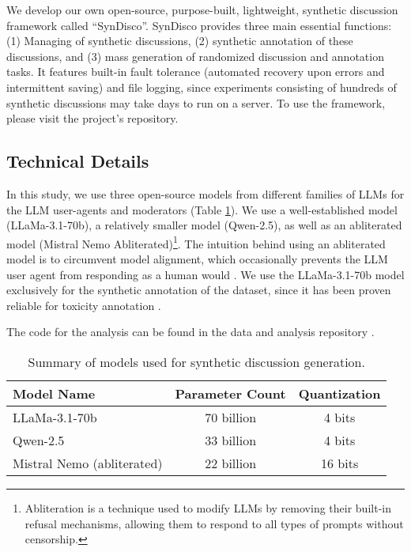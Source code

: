 We develop our own open-source, purpose-built, lightweight, synthetic discussion framework called “SynDisco”. SynDisco provides three main essential functions: (1) Managing of synthetic discussions, (2) synthetic annotation of these discussions, and (3) mass generation of randomized discussion and annotation tasks. It features built-in fault tolerance (automated recovery upon errors and intermittent saving) and file logging, since experiments consisting of hundreds of synthetic discussions may take days to run on a server. To use the framework, please visit the project's repository\projectlink.

\subsection{Technical Details}
\label{ssec:experimental:technical}

In this study, we use three open-source models from different families of \acp{LLM} for the \ac{LLM} user-agents and moderators (Table \ref{tab:models}). We use a well-established model (LLaMa-3.1-70b), a relatively smaller model (Qwen-2.5), as well as an abliterated model (Mistral Nemo Abliterated)\footnote{Abliteration is a technique used to modify \acp{LLM} by removing their built-in refusal mechanisms, allowing them to respond to all types of prompts without censorship.}. The intuition behind using an abliterated model is to circumvent model alignment, which occasionally prevents the \ac{LLM} user agent from responding as a human would \cite{Park2023GenerativeAI}. We use the LLaMa-3.1-70b model exclusively for the synthetic annotation of the dataset, since it has been proven reliable for toxicity annotation \cite{koh-etal-2024-llms}. 

The code for the analysis can be found in the data and analysis repository \analysislink.

\begin{table}[ht]
\centering
    \begin{tabular}{|l|c|c|}
        \hline
        \rowcolor{gray!30} \textbf{Model Name} & \textbf{Parameter Count} & \textbf{Quantization} \\
        \hline
        LLaMa-3.1-70b & 70 billion & 4 bits \\
        Qwen-2.5 & 33 billion & 4 bits \\
        Mistral Nemo (abliterated) & 22 billion & 16 bits\\
        \hline
    \end{tabular}
\caption{Summary of models used for synthetic discussion generation.}
\label{tab:models}
\end{table}

